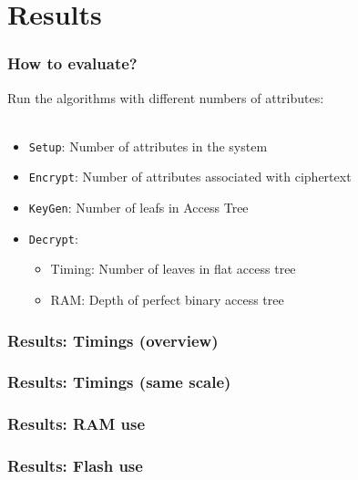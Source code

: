 \section{Results}
\begin{frame}[c]
    \frametitle{How to evaluate?}
    \begin{minipage}{.59\textwidth}
        Run the algorithms with different numbers of attributes:\\
        ~
        \begin{itemize} 
            \setlength\itemsep{.75em}
            \item \texttt{Setup}: Number of attributes in the system
            \item \texttt{Encrypt}: Number of attributes associated with ciphertext
            \item \texttt{KeyGen}: Number of leafs in Access Tree
            \item \texttt{Decrypt}: \begin{itemize}
                \item Timing: Number of leaves in flat access tree
                \item RAM: Depth of perfect binary access tree
            \end{itemize}
        \end{itemize}
    \end{minipage}
    \begin{minipage}{.4\textwidth}
        
    \end{minipage}
\end{frame}

\begin{frame}[c]
    \centering
    \frametitle{Results: Timings (overview)}
    \resizebox{!}{.35\textheight}{
        
    }
\end{frame}

\begin{frame}[c]
    \centering
    \frametitle{Results: Timings (same scale)}
    \resizebox{!}{.35\textheight}{
        
    }
\end{frame}

\begin{frame}[c]
    \frametitle{Results: RAM use}
    \centering
    
\end{frame}

\begin{frame}
    \frametitle{Results: Flash use}
    \centering
    
\end{frame}


